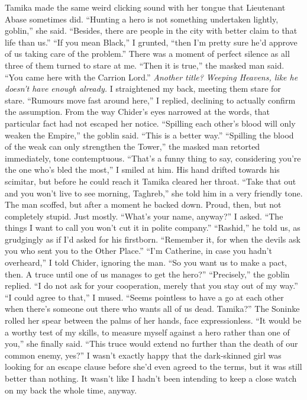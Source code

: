 \documentclass[12pt, openany]{book}
\begin{document}
Tamika made the same weird clicking sound with her tongue that Lieutenant Abase sometimes did.
“Hunting a hero is not something undertaken lightly, goblin,” she said. “Besides, there are people in the city with better claim to that life than us.”
“If you mean Black,” I grunted, “then I’m pretty sure he’d approve of us taking care of the problem.”
There was a moment of perfect silence as all three of them turned to stare at me.
“Then it is true,” the masked man said. “You came here with the Carrion Lord.”
\textit{Another title? Weeping Heavens, like he doesn’t have enough already.} I straightened my back, meeting them stare for stare.
“Rumours move fast around here,” I replied, declining to actually confirm the assumption.
From the way Chider’s eyes narrowed at the words, that particular fact had not escaped her notice.
“Spilling each other’s blood will only weaken the Empire,” the goblin said. “This is a better way.”
“Spilling the blood of the weak can only strengthen the Tower,” the masked man retorted immediately, tone contemptuous.
“That’s a funny thing to say, considering you’re the one who’s bled the most,” I smiled at him.
His hand drifted towards his scimitar, but before he could reach it Tamika cleared her throat.
“Take that out and you won’t live to see morning, Taghreb,” she told him in a very friendly tone.
The man scoffed, but after a moment he backed down. Proud, then, but not completely stupid. Just mostly.
“What’s your name, anyway?” I asked. “The things I want to call you won’t cut it in polite company.”
“Rashid,” he told us, as grudgingly as if I’d asked for his firstborn. “Remember it, for when the devils ask you who sent you to the Other Place.”
“I’m Catherine, in case you hadn’t overheard,” I told Chider, ignoring the man. “So you want us to make a pact, then. A truce until one of us manages to get the hero?”
“Precisely,” the goblin replied. “I do not ask for your cooperation, merely that you stay out of my way.”
“I could agree to that,” I mused. “Seems pointless to have a go at each other when there’s someone out there who wants all of us dead. Tamika?”
The Soninke rolled her spear between the palms of her hands, face expressionless.
“It would be a worthy test of my skills, to measure myself against a hero rather than one of you,” she finally said. “This truce would extend no further than the death of our common enemy, yes?”
I wasn’t exactly happy that the dark-skinned girl was looking for an escape clause before she’d even agreed to the terms, but it was still better than nothing. It wasn’t like I hadn’t been intending to keep a close watch on my back the whole time, anyway.
\end{document}
